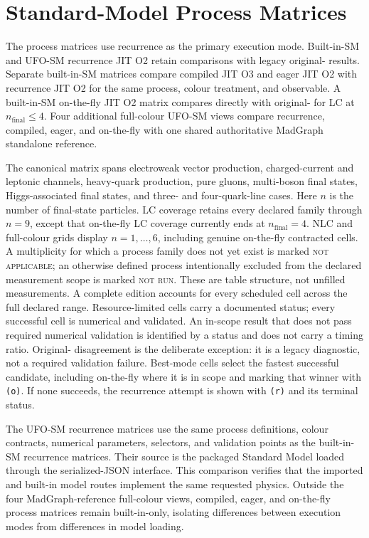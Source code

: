 \section{Standard-Model Process Matrices}
\label{sec:three-mode-performance-tables}

The process matrices use recurrence as the primary \PAC{} execution mode.
Built-in-SM and UFO-SM recurrence JIT O2 retain comparisons with legacy
original-\AC{} results.  Separate built-in-SM matrices compare compiled JIT O3
and eager JIT O2 with recurrence JIT O2 for the same process, colour treatment,
and observable. A built-in-SM on-the-fly JIT O2 matrix compares directly with
original-\AC{} for LC at \(n_{\mathrm{final}}\leq4\). Four additional
full-colour UFO-SM views compare recurrence, compiled, eager, and on-the-fly
with one shared authoritative MadGraph standalone reference.

The canonical matrix spans electroweak vector production, charged-current and
leptonic channels, heavy-quark production, pure gluons, multi-boson final
states, Higgs-associated final states, and three- and four-quark-line cases.
Here \(n\) is the number of final-state particles.  LC coverage retains every
declared family through \(n=9\), except that on-the-fly LC coverage currently
ends at \(n_{\mathrm{final}}=4\). NLC and full-colour grids display
\(n=1,\ldots,6\), including genuine on-the-fly contracted cells. A multiplicity
for which a process family does not yet exist
is marked \textsc{not applicable}; an otherwise defined process intentionally
excluded from the declared measurement scope is marked \textsc{not run}.
These are table structure, not unfilled measurements.  A complete edition
accounts for every scheduled cell across the full declared range.
Resource-limited cells carry a documented status; every successful cell is
numerical and validated.  An in-scope result that does not pass required
numerical validation is identified by a status and does not carry a timing
ratio. Original-\AC{} disagreement is the deliberate exception: it is a legacy
diagnostic, not a required validation failure.
Best-mode cells select the fastest successful candidate, including on-the-fly
where it is in scope and marking that winner with \texttt{(o)}. If none
succeeds, the recurrence attempt is shown with \texttt{(r)} and its terminal
status.

The UFO-SM recurrence matrices use the same process definitions, colour
contracts, numerical parameters, selectors, and validation points as the
built-in-SM recurrence matrices. Their source is the packaged Standard Model
loaded through the serialized-JSON interface. This comparison verifies that the
imported and built-in model routes implement the same requested physics.
Outside the four MadGraph-reference full-colour views, compiled, eager, and
on-the-fly process matrices remain built-in-only, isolating differences between
execution modes from differences in model loading.

